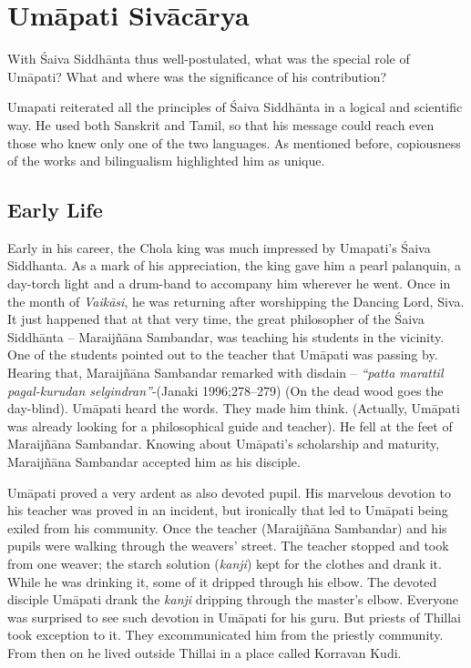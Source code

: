 \section*{Umāpati Sivācārya}

With Śaiva Siddhānta thus well-postulated, what was the special role of Umāpati? What and where was the significance of his contribution?

Umapati reiterated all the principles of Śaiva Siddhānta in a logical and scientific way. He used both Sanskrit and Tamil, so that his message could reach even those who knew only one of the two languages. As mentioned before, copiousness of the works and bilingualism highlighted him as unique.

\subsection*{Early Life}

Early in his career, the Chola king was much impressed by Umapati’s Śaiva Siddhanta. As a mark of his appreciation, the king gave him a pearl palanquin, a day-torch light and a drum-band to accompany him wherever he went. Once in the month of \textit{Vaikāsi}, he was returning after worshipping the Dancing Lord, Siva. It just happened that at that very time, the great philosopher of the Śaiva Siddhānta – Maraijñāna Sambandar, was teaching his students in the vicinity. One of the students pointed out to the teacher that Umāpati was passing by. Hearing that, Maraijñāna Sambandar remarked with disdain – \textit{“patta marattil pagal-kurudan selgindran”}-(Janaki 1996;278–279) (On the dead wood goes the day-blind). Umāpati heard the words. They made him think. (Actually, Umāpati was already looking for a philosophical guide and teacher). He fell at the feet of Maraijñāna Sambandar. Knowing about Umāpati’s scholarship and maturity, Maraijñāna Sambandar accepted him as his disciple.

Umāpati proved a very ardent as also devoted pupil. His marvelous devotion to his teacher was proved in an incident, but ironically that led to Umāpati being exiled from his community. Once the teacher (Maraijñāna Sambandar) and his pupils were walking through the weavers’ street. The teacher stopped and took from one weaver; the starch solution (\textit{kanji}) kept for the clothes and drank it. While he was drinking it, some of it dripped through his elbow. The devoted disciple Umāpati drank the \textit{kanji} dripping through the master’s elbow. Everyone was surprised to see such devotion in Umāpati for his guru. But priests of Thillai took exception to it. They excommunicated him from the priestly community. From then on he lived outside Thillai in a place called Korravan Kudi.

